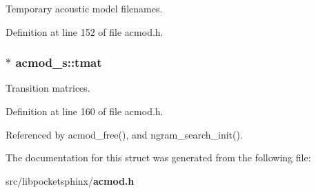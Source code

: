 Temporary acoustic model filenames. 



Definition at line 152 of file acmod.\-h.

\subsubsection[{tmat}]{$\ast$ acmod\-\_\-s\-::tmat}\label{structacmod__s_aaa3982184a49f0d61e397ba89f486259}


Transition matrices. 



Definition at line 160 of file acmod.\-h.



Referenced by acmod\-\_\-free(), and ngram\-\_\-search\-\_\-init().



The documentation for this struct was generated from the following file\-:\begin{DoxyCompactItemize}
\item 
src/libpocketsphinx/{\bf acmod.\-h}\end{DoxyCompactItemize}
